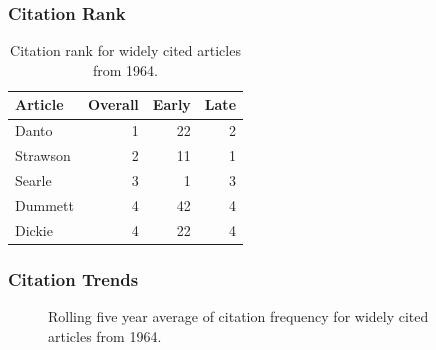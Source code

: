 \documentclass[
  10pt,
  letterpaper,
  DIV=11,
  numbers=noendperiod,
  twoside]{scrartcl}
\begin{document}
\subsubsection*{Citation Rank}\label{sec-rank-1964}

\begin{longtable}[]{@{}lrrr@{}}

\caption{\label{tbl-citation-rank-1964}Citation rank for widely cited
articles from 1964.}

\tabularnewline

\toprule\noalign{}
Article & Overall & Early & Late \\
\midrule\noalign{}
\endhead
\bottomrule\noalign{}
\endlastfoot
Danto & 1 & 22 & 2 \\
Strawson & 2 & 11 & 1 \\
Searle & 3 & 1 & 3 \\
Dummett & 4 & 42 & 4 \\
Dickie & 4 & 22 & 4 \\

\end{longtable}

\subsubsection*{Citation Trends}\label{sec-trends-1964}

\begin{figure}


\caption{\label{fig-citation-spaghetti-1964}Rolling five year average of
citation frequency for widely cited articles from 1964.}

\end{figure}%
\end{document}
